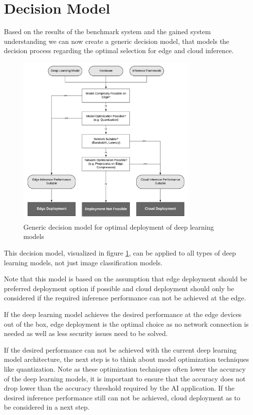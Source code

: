 \section{Decision Model}

Based on the results of the benchmark system and the gained system understanding we can now create a generic decision model, that models the decision process regarding the optimal selection for edge and cloud inference.

\begin{figure}[!htb]
\centering
\includegraphics[width=0.8\textwidth]{./Bilder/DecisionModel.pdf}
\caption{Generic decision model for optimal deployment of deep learning models}
\label{fig:DecisionModel}
\end{figure}


This decision model, visualized in figure \ref{fig:DecisionModel}, can be applied to all types of deep learning models, not just image classification models.

Note that this model is based on the assumption that edge deployment should be preferred deployment option if possible and cloud deployment should only be considered if the required inference performance can not be achieved at the edge.


If the deep learning model achieves the desired performance at the edge devices out of the box, edge deployment is the optimal choice as no network connection is needed as well as less security issues need to be solved.

If the desired performance can not be achieved with the current deep learning model architecture, the next step is to think about model optimization techniques like quantization.
Note as these optimization techniques often lower the accuracy of the deep learning models, it is important to ensure that the accuracy does not drop lower than the accuracy threshold required by the AI application.
If the desired inference performance still can not be achieved, cloud deployment as to be considered in a next step.

